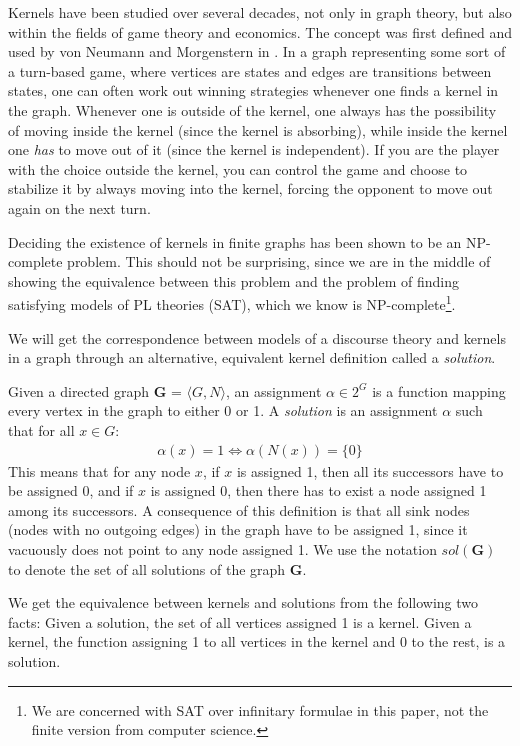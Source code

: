 Kernels have been studied over several decades, not only in graph theory, but also within the fields of game theory and economics.
The concept was first defined and used by von Neumann and Morgenstern in \cite{neumann}.
In a graph representing some sort of a turn-based game, where vertices are states and edges are transitions between states, one can often work out winning strategies whenever one finds a kernel in the graph.
Whenever one is outside of the kernel, one always has the possibility of moving inside the kernel (since the kernel is absorbing), while inside the kernel one \textit{has} to move out of it (since the kernel is independent).
If you are the player with the choice outside the kernel, you can control the game and choose to stabilize it by always moving into the kernel, forcing the opponent to move out again on the next turn.

Deciding the existence of kernels in finite graphs has been shown to be an NP-complete problem\cite{chvatal}.
This should not be surprising, since we are in the middle of showing the equivalence between this problem and the problem of finding satisfying models of PL theories (SAT), which we know is NP-complete\footnote{We are concerned with SAT over infinitary formulae in this paper, not the finite version from computer science.}.

We will get the correspondence between models of a discourse theory and kernels in a graph through an alternative, equivalent kernel definition called a \textit{solution}.

Given a directed graph \textbf{G} = $\langle G,N \rangle$, an assignment $\alpha \in 2^G$ is a function mapping every vertex in the graph to either 0 or 1.
A \textit{solution} is an assignment $\alpha$ such that for all $x \in G:$
\begin{align}
  \alpha(x) = 1 \iff \alpha(N(x)) = \{ 0 \}
\end{align}
This means that for any node $x$, if $x$ is assigned 1, then all its successors have to be assigned  0, and if $x$ is assigned 0, then there has to exist a node assigned 1 among its successors.
A consequence of this definition is that all sink nodes (nodes with no outgoing edges) in the graph have to be assigned 1, since it vacuously does not point to any node assigned 1.
We use the notation $sol(\mathbf{G})$ to denote the set of all solutions of the graph \textbf{G}.

We get the equivalence between kernels and solutions from the following two facts:
Given a solution, the set of all vertices assigned 1 is a kernel.
Given a kernel, the function assigning 1 to all vertices in the kernel and 0 to the rest, is a solution.
